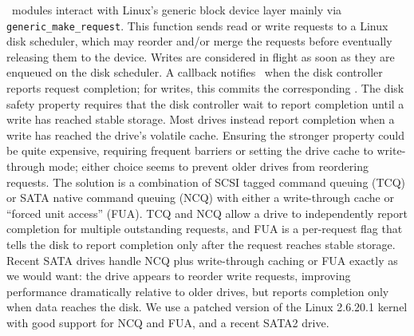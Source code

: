 \Kudos\ modules interact with Linux's generic block device layer mainly via
\verb+generic_make_request+.
%
This function sends read or write requests to a Linux disk scheduler, which
may reorder and/or merge the requests before eventually releasing them to
the device.
%
Writes are considered in flight as soon as they are enqueued on the disk
scheduler.
%
A callback notifies \Kudos\ when the disk controller reports request
completion; for writes, this commits the corresponding \patches.
%
The disk safety property requires that the disk controller wait to report
completion until a write has reached stable storage.
%
Most drives instead report completion when a write has reached the drive's
volatile cache.
%
Ensuring the stronger property could be quite expensive, requiring frequent
barriers or setting the drive cache to write-through mode; either choice
seems to prevent older drives from reordering requests.
%
The solution is a combination of SCSI tagged command queuing (TCQ) or SATA
native command queuing (NCQ) with either a write-through cache or ``forced
unit access'' (FUA).
%
TCQ and NCQ allow a drive to independently report completion for multiple
outstanding requests, and FUA is a per-request flag that tells the disk
to report completion only after the request reaches stable storage.
%
Recent SATA drives handle NCQ plus write-through caching or FUA exactly as
we would want: the drive appears to reorder write requests, improving
performance dramatically relative to older drives, but reports completion
only when data reaches the disk.
%
We use a patched version of the Linux 2.6.20.1 kernel with good support for
NCQ and FUA, and a recent SATA2 drive.


